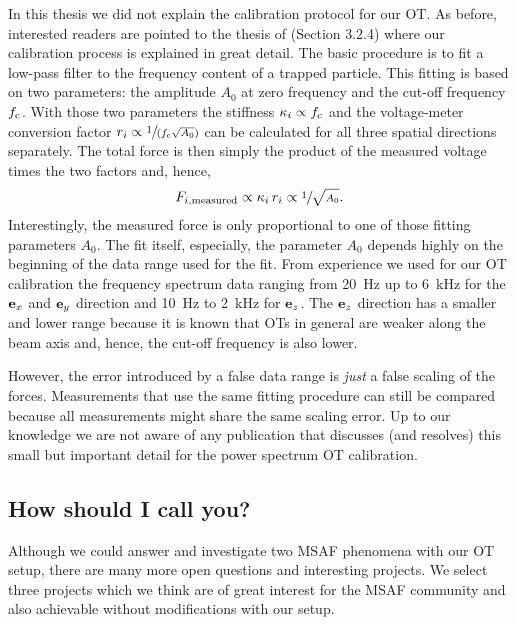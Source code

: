 In this thesis we did not explain the calibration protocol for our OT. As 
before, interested readers are pointed to the thesis of  
(Section 3.2.4) where our calibration process is explained in great detail. The 
basic procedure is to fit a low-pass filter to the frequency content of a 
trapped particle. This fitting is based on two parameters: the amplitude 
$A_{0}$ at zero frequency and the cut-off frequency $f_{\mathrm{c}}$. With those 
two parameters the stiffness $\kappa_{i}\propto f_{\mathrm{c}}$ and the 
voltage-meter conversion factor $r_{i}\propto \sfrac{1}{(f_{\mathrm{c}}\sqrt{A_{0}} 
)}$ can be calculated for all three spatial directions separately. The total 
force is then simply the product of the measured voltage times the two factors 
and, hence, \begin{equation}
  F_{i,\mathrm{measured}}\propto \kappa_{i}\,r_{i}\propto 
  \sfrac{1}{\sqrt{A_{0}}}.
\end{equation}
Interestingly, the measured force is only proportional to one of those fitting 
parameters $A_{0}$. The fit itself, especially, the parameter $A_{0}$ depends 
highly on the beginning of the data range used for the fit. From experience we 
used for our OT calibration the frequency spectrum data ranging from 
\SI{20}{\hertz} up to \SI{6}{\kilo\hertz} for the $\vb{e}_{x}$ and $\vb{e}_{y}$ direction and 
\SI{10}{\hertz} to \SI{2}{\kilo\hertz} for $\vb{e}_{z}$. The $\vb{e}_{z}$ direction has a 
smaller and lower range because it is known that OTs in general are weaker 
along the beam axis and, hence, the cut-off frequency is also lower.

However, the error introduced by a false data range is \emph{just} a false 
scaling of the forces. Measurements that use the same fitting procedure can 
still be compared because all measurements might share the same scaling error. 
Up to our knowledge we are not aware of any publication that discusses (and 
resolves) this small but important detail for the power spectrum OT 
calibration.

\subsection{How should I call you?}

Although we could answer and investigate two MSAF phenomena with our OT setup, 
there are many more open questions and interesting projects. We select three 
projects which we think are of great interest for the MSAF community and also 
achievable without modifications with our setup.

